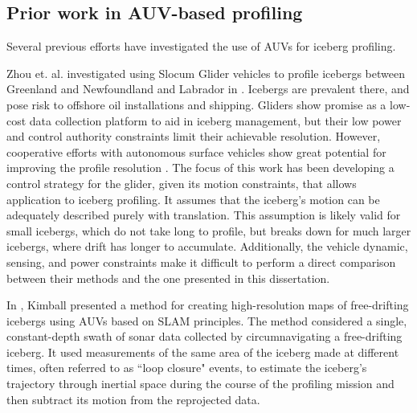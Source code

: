 \subsection{Prior work in AUV-based profiling}

Several previous efforts have investigated the use of AUVs for iceberg profiling. 

Zhou et. al. investigated using Slocum Glider vehicles to profile icebergs between Greenland and Newfoundland and Labrador in \cite{Zhou2014}. Icebergs are prevalent there, and pose risk to offshore oil installations and shipping. Gliders show promise as a low-cost data collection platform to aid in iceberg management, but their low power and control authority constraints limit their achievable resolution. However, cooperative efforts with autonomous surface vehicles show great potential for improving the profile resolution \cite{Smith2014}. The focus of this work has been developing a control strategy for the glider, given its motion constraints, that allows application to iceberg profiling. It assumes that the iceberg's motion can be adequately described purely with translation. This assumption is likely valid for small icebergs, which do not take long to profile, but breaks down for much larger icebergs, where drift has longer to accumulate. Additionally, the vehicle dynamic, sensing, and power constraints make it difficult to perform a direct comparison between their methods and the one presented in this dissertation. 

In \cite{Kimball2011b}, Kimball presented a method for creating high-resolution maps of free-drifting icebergs using AUVs based on SLAM principles. The method considered a single, constant-depth swath of sonar data collected by circumnavigating a free-drifting iceberg. It used measurements of the same area of the iceberg made at different times, often referred to as  ``loop closure" events, to estimate the iceberg's trajectory through inertial space during the course of the profiling mission and then subtract its motion from the reprojected data. 


